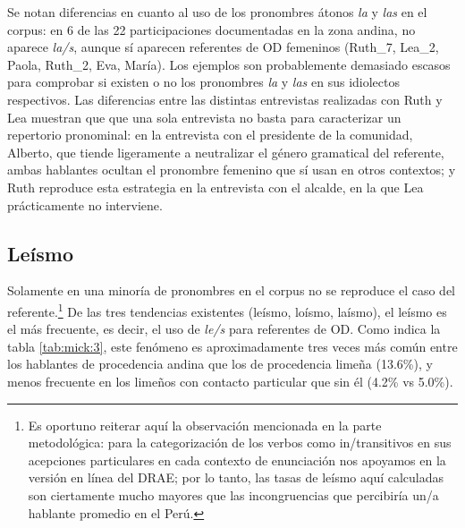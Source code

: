 \documentclass[output=paper]{../langscibook}
\begin{document}
Se notan diferencias en cuanto al uso de los pronombres átonos \textit{la} y \textit{las} en el corpus: en 6 de las 22 participaciones documentadas en la zona andina, no aparece \textit{la/s}, aunque sí aparecen referentes de OD femeninos (Ruth\_7, Lea\_2, Paola, Ruth\_2, Eva, María). Los ejemplos son probablemente demasiado escasos para comprobar si existen o no los pronombres \textit{la} y \textit{las} en sus idiolectos respectivos. Las diferencias entre las distintas entrevistas realizadas con Ruth y Lea muestran que que una sola entrevista no basta para caracterizar un repertorio pronominal: en la entrevista con el presidente de la comunidad, Alberto, que tiende ligeramente a neutralizar el género gramatical del referente, ambas hablantes ocultan el pronombre femenino que sí usan en otros contextos; y Ruth reproduce esta estrategia en la entrevista con el alcalde, en la que Lea prácticamente no interviene.

\subsection{Leísmo}

Solamente en una minoría de pronombres en el corpus no se reproduce el caso del referente.\footnote{Es oportuno reiterar aquí la observación mencionada en la parte metodológica: para la categorización de los verbos como in/transitivos en sus acepciones particulares en cada contexto de enunciación nos apoyamos en la versión en línea del DRAE; por lo tanto, las tasas de leísmo aquí calculadas son ciertamente mucho mayores que las incongruencias que percibiría un/a hablante promedio en el Perú.} De las tres tendencias existentes (leísmo, loísmo, laísmo), el leísmo es el más frecuente, es decir, el uso de \textit{le/s} para referentes de OD. Como indica la tabla \ref{tab:mick:3}, este fenómeno es aproximadamente tres veces más común entre los hablantes de procedencia andina que los de procedencia limeña (13.6\%), y menos frecuente en los limeños con contacto particular que sin él (4.2\% vs 5.0\%).
\end{document}
